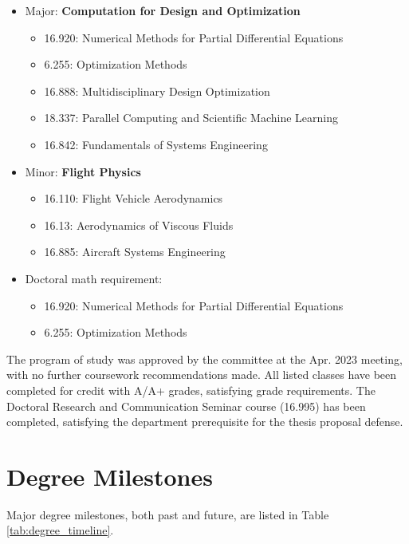 \documentclass[12pt,vi,oneside,table]{report}
\begin{document}
    \begin{itemize}[noitemsep]
        \item Major: \textbf{Computation for Design and Optimization}
        \begin{itemize}[noitemsep]
            \item 16.920: Numerical Methods for Partial Differential Equations
            \item 6.255: Optimization Methods
            \item 16.888: Multidisciplinary Design Optimization
            \item 18.337: Parallel Computing and Scientific Machine Learning
            \item 16.842: Fundamentals of Systems Engineering
        \end{itemize}
        \item Minor: \textbf{Flight Physics}
        \begin{itemize}[noitemsep]
            \item 16.110: Flight Vehicle Aerodynamics
            \item 16.13: Aerodynamics of Viscous Fluids
            \item 16.885: Aircraft Systems Engineering
        \end{itemize}
        \item Doctoral math requirement:
        \begin{itemize}[noitemsep]
            \item 16.920: Numerical Methods for Partial Differential Equations
            \item 6.255: Optimization Methods
        \end{itemize}
    \end{itemize}

    \noindent The program of study was approved by the committee at the Apr. 2023 meeting, with no further coursework recommendations made. All listed classes have been completed for credit with A/A+ grades, satisfying grade requirements. The Doctoral Research and Communication Seminar course (16.995) has been completed, satisfying the department prerequisite for the thesis proposal defense.


    \section{Degree Milestones}

    Major degree milestones, both past and future, are listed in Table \ref{tab:degree_timeline}.
\end{document}
